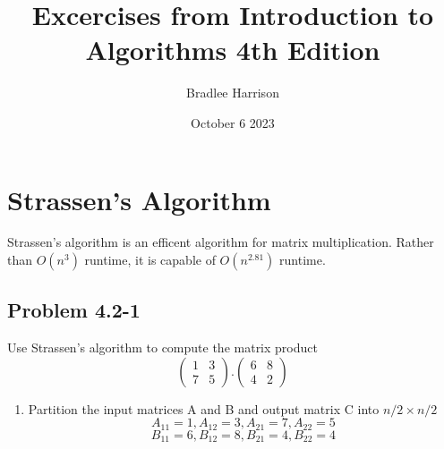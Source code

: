 \documentclass[12pt]{article}
\begin{document}
	
	\title{Excercises from Introduction to Algorithms 4th Edition}
	\author{Bradlee Harrison}
	\date{October 6 2023}
	\maketitle
	\section{Strassen's Algorithm}
	Strassen's algorithm is an efficent algorithm for matrix multiplication. Rather than $O(n^3)$ runtime, it is capable of $O(n^2.81)$ runtime.
	
	\subsection*{Problem 4.2-1}
	Use Strassen's algorithm to compute the matrix product
	$$
	\begin{pmatrix}
		1 & 3 \\ 7 & 5 
	\end{pmatrix} .
	\begin{pmatrix}
		6 & 8 \\ 4 & 2
	\end{pmatrix}$$
	\begin{enumerate}
		\item Partition the input matrices A and B and output matrix C into $n/2 \times n/2$ 
		$$ A_{11} = 1, A_{12} = 3, A_{21} = 7, A_{22} = 5 $$
		$$ B_{11} = 6, B_{12} = 8, B_{21} = 4, B_{22} = 4 $$
		
	\end{enumerate}
\end{document}
